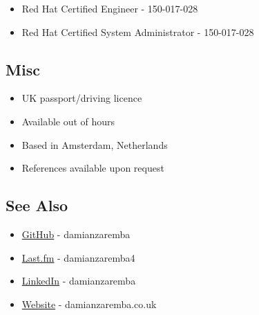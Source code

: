 \begin{itemize}
\itemsep1pt\parskip0pt
\item
  Red Hat Certified Engineer - 150-017-028
\item
  Red Hat Certified System Administrator - 150-017-028
\end{itemize}

\subsection{Misc}\label{misc}

\begin{itemize}
\itemsep1pt\parskip0pt
\item
  UK passport/driving licence
\item
  Available out of hours
\item
  Based in Amsterdam, Netherlands
\item
  References available upon request
\end{itemize}

\subsection{See Also}\label{see-also}

\begin{itemize}
\itemsep1pt\parskip0pt
\item
  \href{https://github.com/damianzaremba}{GitHub} - damianzaremba
\item
  \href{http://last.fm/user/damianzaremba4}{Last.fm} - damianzaremba4
\item
  \href{http://uk.linkedin.com/in/damianzaremba}{LinkedIn} -
  damianzaremba
\item
  \href{http://damianzaremba.co.uk}{Website} - damianzaremba.co.uk
\end{itemize}
